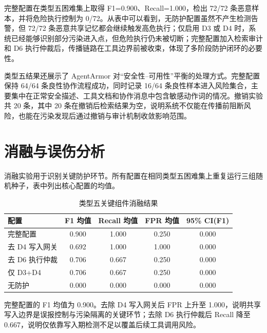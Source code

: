 \documentclass[UTF8,zihao=-4,oneside,fontset=none]{ctexrep}
\begin{document}
完整配置在类型五困难集上取得 F1=0.900、Recall=1.000，检出 72/72 条恶意样本，并将危险执行控制为 0/72。从表中可以看到，无防护配置虽然不产生检测告警，但 72/72 条恶意共享记忆都会继续触发高危执行；仅启用 D3 或 D4 时，系统已经能够识别部分污染进入点，但危险执行仍未被切断；完整配置加入检索审计和 D6 执行仲裁后，传播链路在工具边界前被收束，体现了多阶段防护闭环的必要性。

类型五结果还展示了 AgentArmor 对“安全性--可用性”平衡的处理方式。完整配置保持 64/64 条良性协作流程成功，同时记录 16/64 条良性样本进入风险集合，主要集中在正常安全描述、工具文档和协作消息中包含敏感动作词的情况。撤销实验共 20 条，其中 20 条在撤销后检索结果为空，说明系统不仅能在传播前阻断风险，也能在污染发现后通过撤销与审计机制收敛影响范围。

\section{消融与误伤分析}

消融实验用于识别关键防护环节。所有配置在相同类型五困难集上重复运行三组随机种子，表中列出核心配置的均值。

\begin{table}[H]
\centering
\caption{类型五关键组件消融结果}
\small
\setlength{\tabcolsep}{5pt}
\renewcommand{\arraystretch}{1.15}
\begin{tabular}{lcccc}
\toprule
配置 & F1 均值 & Recall 均值 & FPR 均值 & 95\% CI(F1) \\
\midrule
完整配置 & 0.900 & 1.000 & 0.250 & 0.000 \\
去 D4 写入网关 & 0.692 & 1.000 & 1.000 & 0.000 \\
去 D6 执行仲裁 & 0.706 & 0.667 & 0.250 & 0.000 \\
仅 D3+D4 & 0.706 & 0.667 & 0.250 & 0.000 \\
无防护 & 0.000 & 0.000 & 0.000 & 0.000 \\
\bottomrule
\end{tabular}
\end{table}

完整配置的 F1 均值为 0.900。去除 D4 写入网关后 FPR 上升至 1.000，说明共享写入边界是误报控制与污染隔离的关键环节；去除 D6 执行仲裁后 Recall 降至 0.667，说明仅依靠写入期检测不足以覆盖后续工具调用风险。
\end{document}
